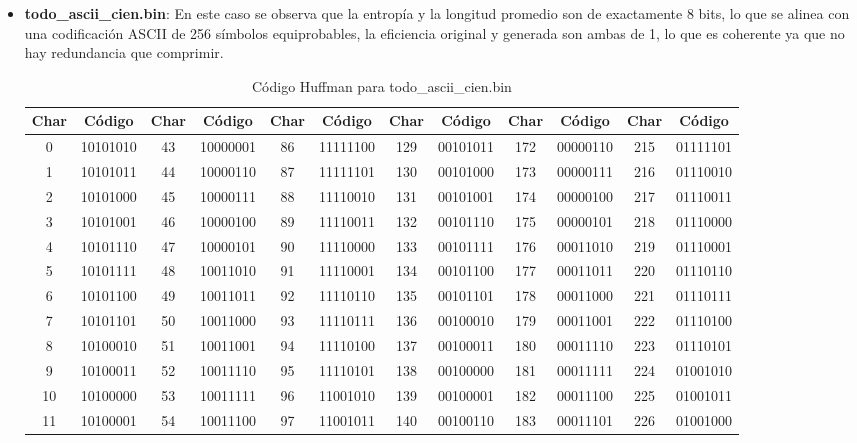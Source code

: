 \documentclass[conference,onecolumn,12pt]{IEEEtran}
\numberwithin{equation}{subsection}
\begin{document}
\begin{itemize}
    \item \textbf{todo\_ascii\_cien.bin}: En este caso se observa que la entropía y la longitud promedio son de exactamente 8 bits, lo que se alinea con una codificación ASCII de 256 símbolos equiprobables, la eficiencia original y generada son ambas de 1, lo que es coherente ya que no hay redundancia que comprimir.
    
    \begin{table}[h!]
\centering
\caption{Código Huffman para todo\_ascii\_cien.bin}
\label{tab:huffman_todo_ascii}
\begin{tabular}{cccccccccccc}
\toprule
\textbf{Char} & \textbf{Código} & \textbf{Char} & \textbf{Código} & \textbf{Char} & \textbf{Código} & \textbf{Char} & \textbf{Código} & \textbf{Char} & \textbf{Código} & \textbf{Char} & \textbf{Código} \\
\midrule
0 & 10101010 & 43 & 10000001 & 86 & 11111100 & 129 & 00101011 & 172 & 00000110 & 215 & 01111101 \\
1 & 10101011 & 44 & 10000110 & 87 & 11111101 & 130 & 00101000 & 173 & 00000111 & 216 & 01110010 \\
2 & 10101000 & 45 & 10000111 & 88 & 11110010 & 131 & 00101001 & 174 & 00000100 & 217 & 01110011 \\
3 & 10101001 & 46 & 10000100 & 89 & 11110011 & 132 & 00101110 & 175 & 00000101 & 218 & 01110000 \\
4 & 10101110 & 47 & 10000101 & 90 & 11110000 & 133 & 00101111 & 176 & 00011010 & 219 & 01110001 \\
5 & 10101111 & 48 & 10011010 & 91 & 11110001 & 134 & 00101100 & 177 & 00011011 & 220 & 01110110 \\
6 & 10101100 & 49 & 10011011 & 92 & 11110110 & 135 & 00101101 & 178 & 00011000 & 221 & 01110111 \\
7 & 10101101 & 50 & 10011000 & 93 & 11110111 & 136 & 00100010 & 179 & 00011001 & 222 & 01110100 \\
8 & 10100010 & 51 & 10011001 & 94 & 11110100 & 137 & 00100011 & 180 & 00011110 & 223 & 01110101 \\
9 & 10100011 & 52 & 10011110 & 95 & 11110101 & 138 & 00100000 & 181 & 00011111 & 224 & 01001010 \\
10 & 10100000 & 53 & 10011111 & 96 & 11001010 & 139 & 00100001 & 182 & 00011100 & 225 & 01001011 \\
11 & 10100001 & 54 & 10011100 & 97 & 11001011 & 140 & 00100110 & 183 & 00011101 & 226 & 01001000 \\

\end{tabular}
\end{table}
\end{itemize}
\end{document}
